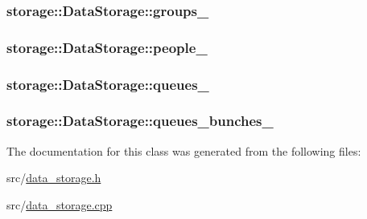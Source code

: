 \label{da/db4/classstorage_1_1DataStorage_ac49bf760dd1492eb566e7bbbf9d84743}
\hypertarget{classstorage_1_1DataStorage_a08dbec98bdd6b7c3e6623a8bbe72235c}{
\subsubsection[{groups\_\-}]{ {\bf storage::DataStorage::groups\_\-}}}
\label{da/db4/classstorage_1_1DataStorage_a08dbec98bdd6b7c3e6623a8bbe72235c}
\hypertarget{classstorage_1_1DataStorage_a8c32de002329fa6018a0957c925cf183}{
\subsubsection[{people\_\-}]{ {\bf storage::DataStorage::people\_\-}}}
\label{da/db4/classstorage_1_1DataStorage_a8c32de002329fa6018a0957c925cf183}
\hypertarget{classstorage_1_1DataStorage_af9a0216e83d32b996086a0b15a5281ab}{
\subsubsection[{queues\_\-}]{ {\bf storage::DataStorage::queues\_\-}}}
\label{da/db4/classstorage_1_1DataStorage_af9a0216e83d32b996086a0b15a5281ab}
\hypertarget{classstorage_1_1DataStorage_a19686eeb613ff2ade96fd557b26627f1}{
\subsubsection[{queues\_\-bunches\_\-}]{ {\bf storage::DataStorage::queues\_\-bunches\_\-}}}
\label{da/db4/classstorage_1_1DataStorage_a19686eeb613ff2ade96fd557b26627f1}


The documentation for this class was generated from the following files:\begin{DoxyCompactItemize}
\item 
src/\hyperlink{data__storage_8h}{data\_\-storage.h}\item 
src/\hyperlink{data__storage_8cpp}{data\_\-storage.cpp}\end{DoxyCompactItemize}
